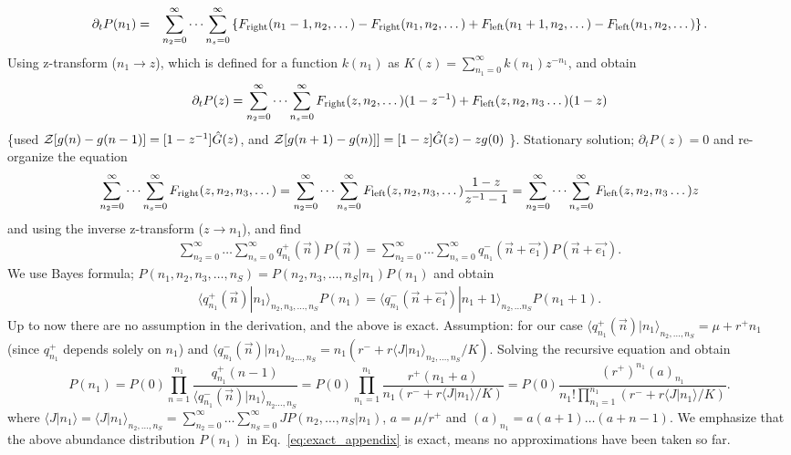 \documentclass[%
 amsmath,amssymb,
 reprint,%
]{revtex4-2}
\begin{document}
\begin{widetext}
\begin{eqnarray}
    \partial_t P(n_1) =&& \sum_{n_2=0}^{\infty}\dots \sum_{n_s=0}^{\infty} \left\{ F_{\rm right}(n_1-1,n_2,\dots)-F_{\rm right}(n_1,n_2,\dots)
     +F_{\rm left}(n_1+1,n_2,\dots)-F_{\rm left}(n_1,n_2,\dots) \right\}.
\end{eqnarray}
Using z-transform ($n_1\rightarrow z$), which is defined for a function $k(n_1)$ as $K(z)=\sum_{n_1=0}^{\infty} k(n_1) z^{-n_1} $, and obtain
\begin{eqnarray}
    \partial_t P(z) = \sum_{n_2=0}^{\infty}\dots \sum_{n_s=0}^{\infty} F_{\rm right}(z,n_2,\dots)(1-z^{-1})+F_{\rm left}(z,n_2,n_3\dots)(1-z) 
\end{eqnarray}
\{used ${\cal Z}[g(n)-g(n-1)]=[1-z^{-1}]\hat{G}(z)$, and ${\cal Z}[g(n+1)-g(n)]]=[1-z]\hat{G}(z)-zg(0)$ \}. Stationary solution; $\partial_t P(z)=0 $ and re-organize the equation 
\begin{eqnarray}
     \sum_{n_2=0}^{\infty}\dots \sum_{n_s=0}^{\infty}F_{\rm right}(z,n_2,n_3,\dots)=\sum_{n_2=0}^{\infty}\dots \sum_{n_s=0}^{\infty} F_{\rm left}(z,n_2,n_3,\dots)\frac{1-z}{z^{-1}-1}=\sum_{n_2=0}^{\infty}\dots \sum_{n_s=0}^{\infty}F_{\rm left}(z,n_2,n_3\dots)z 
\end{eqnarray}
and using the inverse z-transform ($z\rightarrow n_1$), and find
\begin{eqnarray}
      \sum_{n_2=0}^{\infty}\dots \sum_{n_s=0}^{\infty}q^+_{n_1}(\vec{n})P(\vec{n})= \sum_{n_2=0}^{\infty}\dots \sum_{n_s=0}^{\infty}q^-_{n_1}(\vec{n}+\vec{e_1})P(\vec{n}+\vec{e_1}). 
\end{eqnarray}
We use Bayes formula; $P(n_1,n_2,n_3,\dots,n_S)=P(n_2,n_3,\dots, n_S|n_1)P(n_1)$ and obtain
\begin{eqnarray}
     \langle q_{n_1}^+(\vec{n})|n_1\rangle_{n_2,n_3,\dots,n_S}P(n_1) = \langle q_{n_1}^-(\vec{n}+\vec{e_1}) |n_1+1\rangle_{n_2,\dots n_S} P(n_1+1). 
\end{eqnarray}
Up to now there are no assumption in the derivation, and the above is exact. Assumption: for our case $\langle q_{n_1}^+(\vec{n})|n_1\rangle_{n_2,\dots,n_S}=\mu + r^+ n_1$ (since $q^+_{n_1}$ depends solely on $n_1$) and $\langle q_{n_1}^-(\vec{n})|n_1\rangle_{n_2\dots,n_S}=n_1\left(r^-+r \langle J|n_1 \rangle_{n_2,\dots,n_S}/K\right)$.
Solving the recursive equation and obtain
\begin{equation}
    P(n_1)=P(0)\prod_{n=1}^{n_1}\frac{q_{n_1}^{+}(n-1)}{\langle q_{n_1}^-(\vec{n})|n_1\rangle_{n_2\dots,n_S}}=P(0)\prod_{n_1=1}^{n_1}\frac{r^+(n_1+a)}{n_1(r^-+r\langle J|n_1\rangle/K)}= P(0)\frac{(r^+)^{n_1}(a)_{n_1}}{n_1!\prod_{n_1=1}^{n_1}(r^-+r\langle J |n_1 \rangle /K)}.
    \label{eq:exact_appendix}
\end{equation}
where
$\langle J |n_1 \rangle =\langle J |n_1 \rangle_{n_2,\dots,n_S}=\sum_{n_2=0}^{\infty}\dots \sum_{n_S=0}^{\infty} J P(n_2,\dots,n_S |n_1) $, $a=\mu/r^+$ and $(a)_{n_1}=a(a+1)\dots (a+n-1)$.
We emphasize that the above abundance distribution $P(n_1)$ in Eq.~\eqref{eq:exact_appendix} is exact, means no approximations have been taken so far.


\end{widetext}
\end{document}
